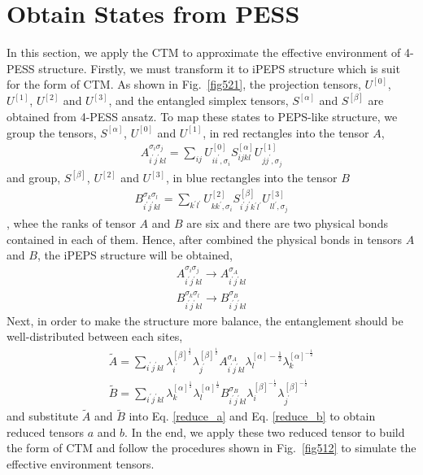 \section{Obtain States from PESS}
\label{pessctm}
In this section, we apply the CTM to approximate the effective environment of 4-PESS structure. Firstly, we must transform it to iPEPS structure which is suit for the form of CTM. As shown in Fig.~\ref{fig521}, the projection tensors, $U^{[0]}$, $U^{[1]}$, $U^{[2]}$ and $U^{[3]}$, and the entangled simplex tensors, $S^{[\alpha]}$ and $S^{[\beta]}$ are obtained from 4-PESS ansatz. To map these states to PEPS-like structure, we group the tensors, $S^{[\alpha]}$, $U^{[0]}$ and $U^{[1]}$, in red rectangles into the tensor $A$, 
\begin{align}
	A^{\sigma_i \sigma_j}_{i^{\prime}j^{\prime}kl} = \sum_{ij}{U^{[0]}_{ ii^{\prime},\sigma_i} S^{[\alpha]}_{ijkl} U^{[1]}_{ jj^{\prime},\sigma_j}}
\end{align}
and group, $S^{[\beta]}$, $U^{[2]}$ and $U^{[3]}$, in blue rectangles into the tensor $B$
\begin{align}
	B^{\sigma_k \sigma_l}_{i^{\prime}j^{\prime}kl} = \sum_{k^{\prime}l^{\prime}}{U^{[2]}_{ kk^{\prime},\sigma_i} S^{[\beta]}_{i^{\prime}j^{\prime}k^{\prime}l^{\prime}} U^{[3]}_{ ll^{\prime},\sigma_j}}
\end{align}
, whee the ranks of tensor $A$ and $B$ are six and there are two physical bonds contained in each of them. Hence, after combined the physical bonds in tensors $A$ and $B$, the iPEPS structure will be obtained,
\begin{align}
	A^{\sigma_i \sigma_j}_{i^{\prime}j^{\prime}kl} \rightarrow  A^{\sigma_A}_{i^{\prime}j^{\prime}kl} \\
	B^{\sigma_k \sigma_l}_{i^{\prime}j^{\prime}kl} \rightarrow  B^{\sigma_B}_{i^{\prime}j^{\prime}kl}
\end{align}
Next, in order to make the structure more balance, the entanglement should be well-distributed between each sites, 
\begin{align}
	\widetilde{A} = \sum_{i^{\prime}j^{\prime}kl}{\lambda^{[\beta]^{\frac{1}{2}}}_{i^{\prime}} \lambda^{[\beta]^{\frac{1}{2}}}_{j^{\prime}} A^{\sigma_A}_{i^{\prime}j^{\prime}kl}\lambda^{[\alpha]-\frac{1}{2}}_{l} \lambda^{[\alpha]^{-\frac{1}{2}}}_{k}}\\
	\widetilde{B} = \sum_{i^{\prime}j^{\prime}kl}{\lambda^{[\alpha]^{\frac{1}{2}}}_{k} \lambda^{[\alpha]^{\frac{1}{2}}}_{l} B^{\sigma_B}_{i^{\prime}j^{\prime}kl} \lambda^{[\beta]^{-\frac{1}{2}}}_{i} \lambda^{[\beta]^{-\frac{1}{2}}}_{j^{\prime}}}
\end{align}
and substitute $\widetilde{A}$ and $\widetilde{B}$ into Eq. \ref{reduce_a} and Eq. \ref{reduce_b} to obtain reduced tensors $a$ and $b$. In the end, we apply these two reduced tensor to build the form of CTM and follow the procedures shown in Fig.~\ref{fig512} to simulate the effective environment tensors.

